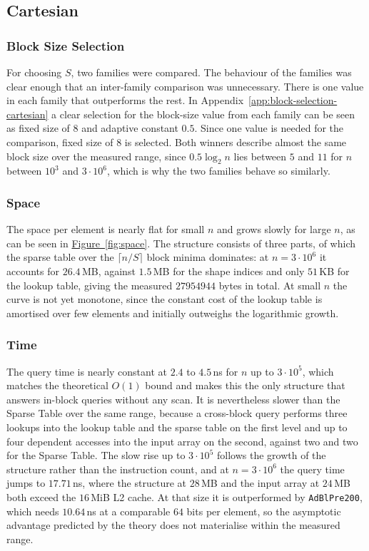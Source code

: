 \documentclass[a4paper,UKenglish,cleveref,thm-restate]{lipics-v2021}
\begin{document}
\subsection{Cartesian}
\subsubsection{Block Size Selection}
For choosing $S$, two families were compared.
The behaviour of the families was clear enough that an inter-family comparison was unnecessary.
There is one value in each family that outperforms the rest.
In Appendix~\ref{app:block-selection-cartesian} a clear selection for the block-size value from each family can be seen as fixed size of $8$ and adaptive constant $0.5$.
Since one value is needed for the comparison, fixed size of $8$ is selected.
Both winners describe almost the same block size over the measured range, since $0.5 \log_2 n$ lies between $5$ and $11$ for $n$ between $10^3$ and $3 \cdot 10^6$, which is why the two families behave so similarly.

\subsubsection{Space}
The space per element is nearly flat for small $n$ and grows slowly for large $n$, as can be seen in \hyperref[fig:space]{Figure~\ref*{fig:space}}.
The structure consists of three parts, of which the sparse table over the $\lceil n/S \rceil$ block minima dominates: at $n = 3 \cdot 10^6$ it accounts for $26.4$\,MB, against $1.5$\,MB for the shape indices and only $51$\,KB for the lookup table, giving the measured $27954944$ bytes in total.
At small $n$ the curve is not yet monotone, since the constant cost of the lookup table is amortised over few elements and initially outweighs the logarithmic growth.

\subsubsection{Time}
The query time is nearly constant at $2.4$ to $4.5$\,ns for $n$ up to $3 \cdot 10^5$, which matches the theoretical $O(1)$ bound and makes this the only structure that answers in-block queries without any scan.
It is nevertheless slower than the Sparse Table over the same range, because a cross-block query performs three lookups into the lookup table and the sparse table on the first level and up to four dependent accesses into the input array on the second, against two and two for the Sparse Table.
The slow rise up to $3 \cdot 10^5$ follows the growth of the structure rather than the instruction count, and at $n = 3 \cdot 10^6$ the query time jumps to $17.71$\,ns, where the structure at $28$\,MB and the input array at $24$\,MB both exceed the $16$\,MiB L2 cache.
At that size it is outperformed by \texttt{AdBlPre200}, which needs $10.64$\,ns at a comparable $64$ bits per element, so the asymptotic advantage predicted by the theory does not materialise within the measured range.
\end{document}
